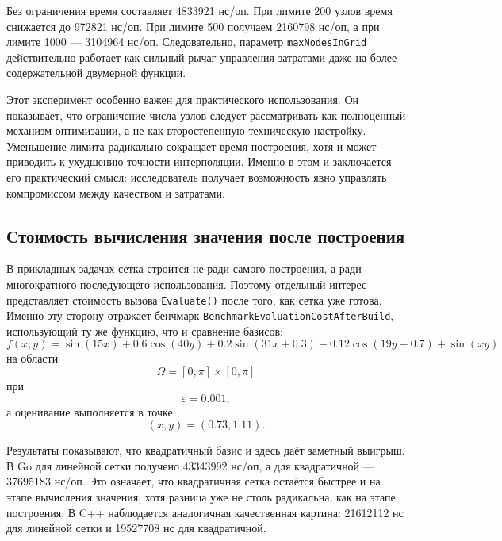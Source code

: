 Без ограничения время составляет 4833921 нс/оп. При лимите 200 узлов время снижается до 972821 нс/оп. При лимите 500 получаем 2160798 нс/оп, а при лимите 1000 --- 3104964 нс/оп. Следовательно, параметр \texttt{maxNodesInGrid} действительно работает как сильный рычаг управления затратами даже на более содержательной двумерной функции.

Этот эксперимент особенно важен для практического использования. Он показывает, что ограничение числа узлов следует рассматривать как полноценный механизм оптимизации, а не как второстепенную техническую настройку. Уменьшение лимита радикально сокращает время построения, хотя и может приводить к ухудшению точности интерполяции. Именно в этом и заключается его практический смысл: исследователь получает возможность явно управлять компромиссом между качеством и затратами.

\subsection{Стоимость вычисления значения после построения}

В прикладных задачах сетка строится не ради самого построения, а ради многократного последующего использования. Поэтому отдельный интерес представляет стоимость вызова \texttt{Evaluate()} после того, как сетка уже готова. Именно эту сторону отражает бенчмарк \texttt{BenchmarkEvaluationCostAfterBuild}, использующий ту же функцию, что и сравнение базисов:
\begin{equation}
    f(x, y) = \sin(15x) + 0.6\cos(40y) + 0.2\sin(31x + 0.3) - 0.12\cos(19y - 0.7) + \sin(xy)
\end{equation}
на области
\begin{equation}
    \Omega = [0, \pi] \times [0, \pi]
\end{equation}
при
\begin{equation}
    \varepsilon = 0.001,
\end{equation}
а оценивание выполняется в точке
\begin{equation}
    (x, y) = (0.73, 1.11).
\end{equation}

Результаты показывают, что квадратичный базис и здесь даёт заметный выигрыш. В Go для линейной сетки получено 43343992 нс/оп, а для квадратичной --- 37695183 нс/оп. Это означает, что квадратичная сетка остаётся быстрее и на этапе вычисления значения, хотя разница уже не столь радикальна, как на этапе построения. В C++ наблюдается аналогичная качественная картина: 21612112 нс для линейной сетки и 19527708 нс для квадратичной.

